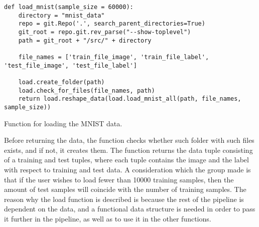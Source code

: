 \begin{listing}[!ht]
\begin{verbatim}
def load_mnist(sample_size = 60000):
    directory = "mnist_data"
    repo = git.Repo('.', search_parent_directories=True)
    git_root = repo.git.rev_parse("--show-toplevel")
    path = git_root + "/src/" + directory
        
    file_names = ['train_file_image', 'train_file_label', 'test_file_image', 'test_file_label']
        
    load.create_folder(path)
    load.check_for_files(file_names, path)
    return load.reshape_data(load.load_mnist_all(path, file_names, sample_size))
\end{verbatim}
\caption{Function for loading the MNIST data.}
\label{lst:load-mist}
\end{listing}

Before returning the data, the function checks whether such folder with such files exists, and if not, it creates them. The function returns the data tuple consisting of a training and test tuples, where each tuple contains the image and the label with respect to training and test data. A consideration which the group made is that if the user wishes to load fewer than 10000 training samples, then the amount of test samples will coincide with the number of training samples. The reason why the load function is described is because the rest of the pipeline is dependent on the data, and a functional data structure is needed in order to pass it further in the pipeline, as well as to use it in the other functions.
